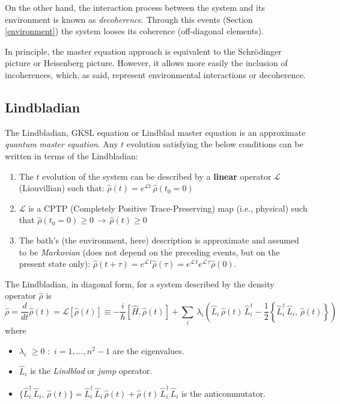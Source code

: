 \documentclass[11pt]{article}
\numberwithin{equation}{section} %
\numberwithin{figure}{section} %
\begin{document}
\begin{appendices}
On the other hand, the interaction process between the system and its environment is known as \emph{decoherence}. Through this events (Section \ref{environment}) the system looses its coherence (off-diagonal elements).


In principle, the master equation approach is equivalent to the Schrödinger picture or Heisenberg picture. However, it allows more easily the inclusion of incoherences, which, as said, represent environmental interactions or decoherence.

\subsection{Lindbladian}
\label{lindblad_appendix}

The Lindbladian, GKSL equation or Lindblad master equation is an approximate \emph{quantum master equation}. Any $t$ evolution satisfying the below conditions can be written in terms of the Lindbladian:
\begin{enumerate}
\item The $t$ evolution of the system can be described by a \textbf{linear} operator $\mathcal{L}$ (Liouvillian) such that: $\hat{\rho}(t)=e^{\mathcal{L}t}\,\hat{\rho}(t_0=0)$
\item $\mathcal{L}$ is a CPTP (Completely Positive Trace-Preserving) map (i.e., physical) such that $\hat{\rho}(t_0=0)\geq 0\,\rightarrow\,\hat{\rho}(t)\geq 0$ 
\item The bath's (the environment, here) description is approximate and assumed to be \emph{Markovian} (does not depend on the preceding events, but on the present state only): $\hat{\rho}(t+\tau)=e^{\mathcal{L}\,t}\hat{\rho}(\tau)=e^{\mathcal{L}\,t}e^{\mathcal{L}\,\tau}\hat{\rho}(0)$.
\end{enumerate}

 The Lindbladian, in diagonal form, for a system described by the   density operator $\hat{\rho}$ is
 \begin{equation} \label{Lindblad_general_form}
\dot{\hat{\rho}}=\frac{d}{dt}\hat{\rho}(t)=\mathcal{L}[\hat{\rho}(t)]\equiv-\frac{i}{\hbar}[\hat{H},\hat{\rho}(t)]+\sum_{i}\,\lambda_i\left(\hat{L}_i\,\hat{\rho}(t)\,\hat{L}_i^\dagger -\frac{1}{2}\left\lbrace\hat{L}_i^\dagger\,\hat{L}_i,\,\hat{\rho}(t)\right\rbrace\right)
\end{equation}
where
\begin{itemize}
\item $\lambda_i$ $\geq 0$ $:$ $i=1,...,n^2-1$ are the eigenvalues.
\item $\hat{L}_i$ is the \emph{Lindblad} or \emph{jump} operator.
\item $\{\hat{L}_i^\dagger\,\hat{L}_i,\,\hat{\rho}(t)\}=\hat{L}_i^\dagger\,\hat{L}_i\,\hat{\rho}(t)+\hat{\rho}(t)\,\hat{L}_i^\dagger\,\hat{L}_i$ is the anticommutator. 
\end{itemize} 


\end{appendices}
\end{document}
